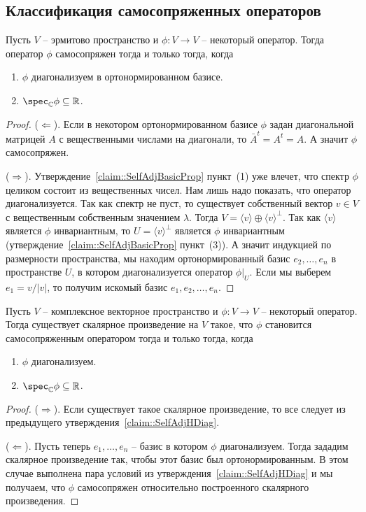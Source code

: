 \subsection{Классификация самосопряженных операторов}

\begin{claim}
\label{claim::SelfAdjHDiag}
Пусть $V$ -- эрмитово пространство и $\phi\colon V\to V$ -- некоторый оператор.
Тогда оператор $\phi$ самосопряжен тогда и только тогда, когда
\begin{enumerate}
\item $\phi$ диагонализуем в ортонормированном базисе.

\item $\spec_\mathbb C\phi\subseteq \mathbb R$.
\end{enumerate}
\end{claim}
\begin{proof}
($\Leftarrow$).
Если в некотором ортонормированном базисе $\phi$ задан диагональной матрицей $A$ с вещественными числами на диагонали, то $\bar A^t = A^t = A$.
А значит $\phi$ самосопряжен.

($\Rightarrow$).
Утверждение~\ref{claim::SelfAdjBasicProp} пункт~(1) уже влечет, что спектр $\phi$ целиком состоит из вещественных чисел.
Нам лишь надо показать, что оператор диагонализуется.
Так как спектр не пуст, то существует собственный вектор $v\in V$ с вещественным собственным значением $\lambda$.
Тогда $V = \langle v\rangle \oplus \langle v\rangle^\bot$.
Так как $\langle v \rangle$ является $\phi$ инвариантным, то $U = \langle v\rangle^\bot$ является $\phi$ инвариантным (утверждение~\ref{claim::SelfAdjBasicProp} пункт~(3)).
А значит индукцией по размерности пространства, мы находим ортонормированный базис $e_2,\ldots,e_n$ в пространстве $U$, в котором диагонализуется оператор $\phi|_U$.
Если мы выберем $e_1 = v / |v|$, то получим искомый базис $e_1,e_2,\ldots,e_n$.
\end{proof}

\begin{claim}
\label{claim::SelfAdjHExists}
Пусть $V$ -- комплексное векторное пространство и $\phi\colon V\to V$ -- некоторый оператор.
Тогда существует скалярное произведение на $V$ такое, что $\phi$ становится самосопряженным оператором тогда и только тогда, когда
\begin{enumerate}
\item $\phi$ диагонализуем.

\item $\spec_\mathbb C\phi\subseteq \mathbb R$.
\end{enumerate}
\end{claim}
\begin{proof}
($\Rightarrow$).
Если существует такое скалярное произведение, то все следует из предыдущего утверждения~\ref{claim::SelfAdjHDiag}.

($\Leftarrow$).
Пусть теперь $e_1,\ldots,e_n$ -- базис в котором $\phi$ диагонализуем.
Тогда зададим скалярное произведение так, чтобы этот базис был ортонормированным.
В этом случае выполнена пара условий из утверждения~\ref{claim::SelfAdjHDiag} и мы получаем, что $\phi$ самосопряжен относительно построенного скалярного произведения.
\end{proof}



